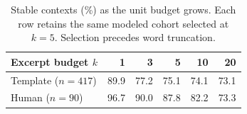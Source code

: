 \begin{table}[t]
\centering\small
\begin{tabular}{@{}lrrrrr@{}}
\toprule
Excerpt budget $k$ & 1 & 3 & 5 & 10 & 20\\
\midrule
Template ($n=417$) & 89.9 & 77.2 & 75.1 & 74.1 & 73.1\\
Human ($n=90$) & 96.7 & 90.0 & 87.8 & 82.2 & 73.3\\
\bottomrule
\end{tabular}
\caption{Stable contexts (\%) as the unit budget grows. Each row retains the same modeled cohort selected at $k=5$. Selection precedes word truncation.}
\label{tab:budget}
\end{table}
